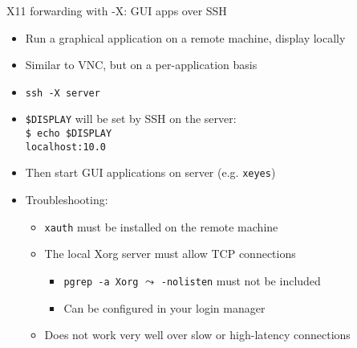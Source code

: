 \documentclass[11pt,final,usepdftitle=false]{beamer}
\begin{document}
\begin{frame}{X11 forwarding with -X: GUI apps over SSH}
\begin{itemize}
	\item Run a graphical application on a remote machine, display locally
		\hbr
	\item Similar to VNC, but on a per-application basis
		\hbr
	\item \texttt{ssh -X server}
		\hbr
	\item \texttt{\$DISPLAY} will be set by SSH on the server:\\
		\texttt{\$ echo \$DISPLAY\\
		localhost:10.0}
		\hbr
\item Then start GUI applications on server (e.g. \texttt{xeyes})
		\hbr
	\item Troubleshooting:
		\begin{itemize}
			\item \texttt{xauth} must be installed on the remote machine
			\item The local Xorg server must allow TCP connections
				\begin{itemize}
					\item \texttt{pgrep -a Xorg} $\leadsto$ \texttt{-nolisten} must not be included 
					\item Can be configured in your login manager
				\end{itemize}
			\item Does not work very well over slow or high-latency connections
		\end{itemize}
\end{itemize}
\end{frame}
\end{document}
